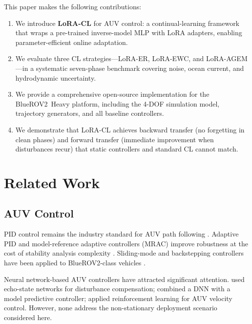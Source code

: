 \documentclass[journal]{IEEEtran}
\begin{document}
This paper makes the following contributions:
\begin{enumerate}
  \item We introduce \textbf{LoRA-CL} for AUV control: a continual-learning
        framework that wraps a pre-trained inverse-model MLP with LoRA
        adapters, enabling parameter-efficient online adaptation.
  \item We evaluate three CL strategies—LoRA-ER, LoRA-EWC, and LoRA-AGEM—in
        a systematic seven-phase benchmark covering noise, ocean current, and
        hydrodynamic uncertainty.
  \item We provide a comprehensive open-source implementation for the
        BlueROV2~Heavy platform, including the 4-DOF simulation model,
        trajectory generators, and all baseline controllers.
  \item We demonstrate that LoRA-CL achieves backward transfer (no forgetting
        in clean phases) and forward transfer (immediate improvement when
        disturbances recur) that static controllers and standard CL cannot match.
\end{enumerate}

\section{Related Work}
\label{sec:related}

\subsection{AUV Control}

PID control remains the industry standard for AUV path following
\cite{fossen2011handbook}. Adaptive PID and model-reference adaptive
controllers (MRAC) improve robustness at the cost of stability analysis
complexity \cite{fossen1999guidance}. Sliding-mode and backstepping
controllers have been applied to BlueROV2-class vehicles
\cite{cai2021adaptive}.

Neural network-based AUV controllers have attracted significant attention.
\citet{fan2018towards} used echo-state networks for disturbance compensation;
\citet{makavita2019experimental} combined a DNN with a model predictive
controller; \citet{carlucho2018incremental} applied reinforcement learning
for AUV velocity control. However, none address the non-stationary deployment
scenario considered here.
\end{document}
